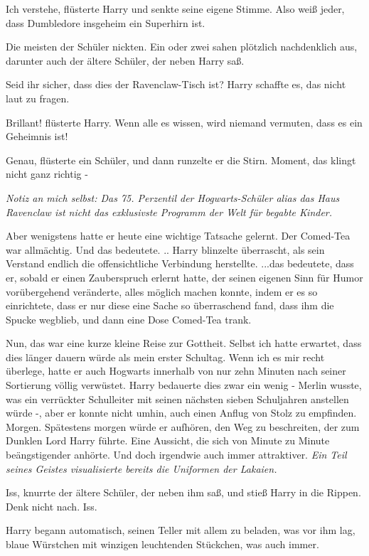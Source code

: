 \glqq{}Ich verstehe\grqq{}, flüsterte Harry und senkte seine eigene Stimme.
\glqq{} Also weiß jeder, dass Dumbledore insgeheim ein Superhirn ist.\grqq{}

Die meisten der Schüler nickten. Ein oder zwei sahen plötzlich nachdenklich aus,
darunter auch der ältere Schüler, der neben Harry saß.

Seid ihr sicher, dass dies der Ravenclaw-Tisch ist? Harry schaffte es, das nicht
laut zu fragen.

\glqq{}Brillant!\grqq{} flüsterte Harry. \glqq{}Wenn alle es wissen, wird
niemand vermuten, dass es ein Geheimnis ist!\grqq{}

\glqq{}Genau\grqq{}, flüsterte ein Schüler, und dann runzelte er die Stirn.
\glqq{} Moment, das klingt nicht ganz richtig -\grqq{}

\emph{Notiz an mich selbst: Das 75. Perzentil der Hogwarts-Schüler alias das
Haus Ravenclaw ist nicht das exklusivste Programm der Welt für begabte Kinder.}

Aber wenigstens hatte er heute eine wichtige Tatsache gelernt. Der Comed-Tea war
allmächtig. Und das bedeutete. .. Harry blinzelte überrascht, als sein Verstand
endlich die offensichtliche Verbindung herstellte. ...das bedeutete, dass er,
sobald er einen Zauberspruch erlernt hatte, der seinen eigenen Sinn für Humor
vorübergehend veränderte, alles möglich machen konnte, indem er es so
einrichtete, dass er nur diese eine Sache so überraschend fand, dass ihm die
Spucke wegblieb, und dann eine Dose Comed-Tea trank.

Nun, das war eine kurze kleine Reise zur Gottheit. Selbst ich hatte erwartet,
dass dies länger dauern würde als mein erster Schultag. Wenn ich es mir recht
überlege, hatte er auch Hogwarts innerhalb von nur zehn Minuten nach seiner
Sortierung völlig verwüstet. Harry bedauerte dies zwar ein wenig - Merlin
wusste, was ein verrückter Schulleiter mit seinen nächsten sieben Schuljahren
anstellen würde -, aber er konnte nicht umhin, auch einen Anflug von Stolz zu
empfinden. Morgen. Spätestens morgen würde er aufhören, den Weg zu beschreiten,
der zum Dunklen Lord Harry führte. Eine Aussicht, die sich von Minute zu Minute
beängstigender anhörte. Und doch irgendwie auch immer attraktiver. \emph{Ein
Teil seines Geistes visualisierte bereits die Uniformen der Lakaien.}

\glqq{}Iss\grqq{}, knurrte der ältere Schüler, der neben ihm saß, und stieß
Harry in die Rippen. \glqq{}Denk nicht nach. Iss.\grqq{}

Harry begann automatisch, seinen Teller mit allem zu beladen, was vor ihm lag,
blaue Würstchen mit winzigen leuchtenden Stückchen, was auch immer.

